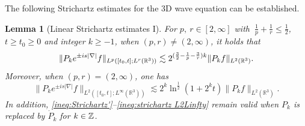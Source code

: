 \documentclass[11pt,twoside]{article}
\def\Z{\mathop{\mathbb Z\kern 0pt}\nolimits}
\def\R{\mathop{\mathbb R\kern 0pt}\nolimits}
\def\f{\frac}
\def\ls{\lesssim}
\newcommand{\pk}{\dot{P}_k}
\theoremstyle{plain}
\newtheorem{lemma}[theorem]{Lemma}
\theoremstyle{definition}
\numberwithin{equation}{section}
\begin{document}
	The following Strichartz estimates for the 3D wave equation can be established.
	\begin{lemma}[Linear Strichartz estimates I]\label{lem:strichartz L2Linfty}
		For $p,\ r\in [2,\infty]$ with $\ \f1p+\f1r\le \f12$, \( t \geq t_0 \geq 0 \) and integer \( k \geq -1 \), when $(p,r) \neq (2,\infty)$, it holds that
		\begin{equation}\label{ineq:Strichartz'}
			\|P_ke^{\pm is|\nabla|}f\|_{L^p([t_0,t];L^r(\R^3))}
			\ls{2^{(\f32-\f1p-\f3r) k}}\|P_kf\|_{L^2(\R^3)}.
		\end{equation}
		Moreover, when $(p,r) = (2,\infty)$, one has
		\begin{equation}\label{ineq:strichartz L2Linfty}
			\|P_k e^{\pm is|\nabla|} f\|_{L^2([t_0,t];L^\infty(\mathbb{R}^3))} \lesssim 2^{k}\ln^{\f{1}{2}}(1+2^kt) \|P_k f\|_{L^2(\mathbb{R}^3)}.
		\end{equation}
		In addition, \eqref{ineq:Strichartz'}--\eqref{ineq:strichartz L2Linfty} remain valid when $P_k$ is replaced by $\pk$ for $k\in\Z$.
	\end{lemma}
\end{document}
